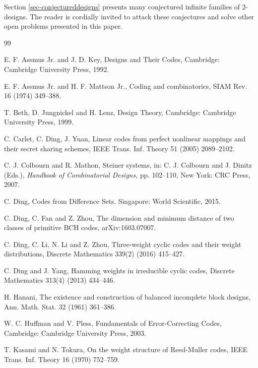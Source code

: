 \documentclass[1p,final]{elsarticle}
\begin{document}
Section \ref{sec-conjectureddesigns} presents many conjectured infinite families of $2$-designs. 
The reader is cordially invited to attack these conjectures and solve other open problems presented 
in this paper.   



\begin{thebibliography}{99}

 E. F. Assmus Jr. and J. D. Key, Designs and Their Codes, Cambridge: Cambridge University 
Press, 1992. 

 E. F. Assmus Jr. and H. F. Mattson Jr., Coding and combinatorics, SIAM
Rev. 16 (1974) 349--388. 

 T. Beth, D. Jungnickel and H. Lenz, Design Theory, Cambridge: Cambridge University 
Press, 1999.  

 C. Carlet, C. Ding, J. Yuan, Linear codes from perfect nonlinear mappings and their secret sharing schemes, IEEE Trans. Inf. Theory 51 (2005) 2089--2102. 

 C. J. Colbourn and R. Mathon, Steiner systems, in: 
C. J. Colbourn and J. Dinitz (Eds.), 
\textit{Handbook of Combinatorial Designs,} pp. 102--110, New York: CRC Press, 2007.  

 C. Ding, Codes from Difference Sets. Singapore: World Scientific, 2015.

 C. Ding, C. Fan and Z. Zhou, The dimension and minimum distance of two classes
of primitive BCH codes, arXiv:1603.07007.

 C. Ding, C. Li, N. Li and Z. Zhou, Three-weight cyclic codes and their weight distributions, Discrete Mathematics 339(2) (2016) 415--427.

 C. Ding and J. Yang, Hamming weights in irreducible cyclic codes,
Discrete Mathematics 313(4) (2013) 434--446.


 H. Hanani, The existence and construction of balanced incomplete block designs,
Ann. Math. Stat. 32 (1961) 361--386.

 W. C. Huffman and V. Pless, Fundamentals of Error-Correcting Codes, 
Cambridge: Cambridge University Press, 2003.  

 T. Kasami and N. Tokura, On the weight structure of Reed-Muller codes, 
IEEE Trans. Inf. Theory 16 (1970) 752--759. 


\end{thebibliography}
\end{document}
